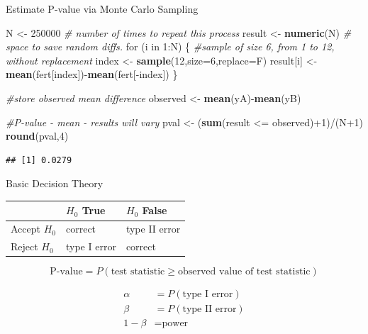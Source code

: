 \documentclass[9pt,ignorenonframetext,]{beamer}
\newenvironment{Shaded}{\begin{snugshade}}{\end{snugshade}}
\newcommand{\KeywordTok}[1]{\textcolor[rgb]{0.13,0.29,0.53}{\textbf{{#1}}}}
\newcommand{\DataTypeTok}[1]{\textcolor[rgb]{0.13,0.29,0.53}{{#1}}}
\newcommand{\DecValTok}[1]{\textcolor[rgb]{0.00,0.00,0.81}{{#1}}}
\newcommand{\StringTok}[1]{\textcolor[rgb]{0.31,0.60,0.02}{{#1}}}
\newcommand{\CommentTok}[1]{\textcolor[rgb]{0.56,0.35,0.01}{\textit{{#1}}}}
\newcommand{\NormalTok}[1]{{#1}}
\begin{document}
\begin{frame}[fragile]{Estimate P-value via Monte Carlo Sampling}

\begin{Shaded}
\begin{Highlighting}[]
\NormalTok{N <-}\StringTok{ }\DecValTok{250000} \CommentTok{# number of times to repeat this process}
\NormalTok{result <-}\StringTok{ }\KeywordTok{numeric}\NormalTok{(N) }\CommentTok{# space to save random diffs.}
\NormalTok{for (i in }\DecValTok{1}\NormalTok{:N)}
\NormalTok{\{ }\CommentTok{#sample of size 6, from 1 to 12, without replacement}
  \NormalTok{index <-}\StringTok{ }\KeywordTok{sample}\NormalTok{(}\DecValTok{12}\NormalTok{,}\DataTypeTok{size=}\DecValTok{6}\NormalTok{,}\DataTypeTok{replace=}\NormalTok{F)}
  \NormalTok{result[i] <-}\StringTok{ }\KeywordTok{mean}\NormalTok{(fert[index])-}\KeywordTok{mean}\NormalTok{(fert[-index])}
\NormalTok{\}}

\CommentTok{#store observed mean difference}
\NormalTok{observed <-}\StringTok{ }\KeywordTok{mean}\NormalTok{(yA)-}\KeywordTok{mean}\NormalTok{(yB)}

\CommentTok{#P-value - mean - results will vary}
\NormalTok{pval <-}\StringTok{ }\NormalTok{(}\KeywordTok{sum}\NormalTok{(result <=}\StringTok{ }\NormalTok{observed)+}\DecValTok{1}\NormalTok{)/(N}\DecValTok{+1}\NormalTok{)}
\KeywordTok{round}\NormalTok{(pval,}\DecValTok{4}\NormalTok{)}
\end{Highlighting}
\end{Shaded}

\begin{verbatim}
## [1] 0.0279
\end{verbatim}

\end{frame}

\begin{frame}{Basic Decision Theory}

\begin{table}[]
\centering
\label{my-label}
\begin{tabular}{l|l|l}
          & $H_0$ True      & $H_0$ False      \\
          \hline
Accept $H_0$ & correct      & type II error \\
\hline
Reject $H_0$ & type I error & correct      
\end{tabular}
\end{table}

\[\text{P-value}=P\left(\text{test statistic} \ge \text{observed value of test statistic} \right) \]

\[\begin{aligned} 
\alpha&=P\left(\text{type I error}\right)  \\
\beta &=P\left(\text{type II error}\right) \\
1-\beta &=\text{power}
\end{aligned}\]

\end{frame}
\end{document}
